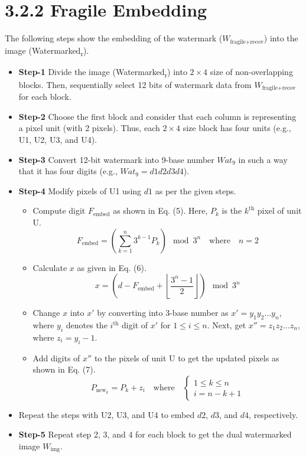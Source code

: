 \documentclass{article}
\begin{document}
\section*{3.2.2 Fragile Embedding}

The following steps show the embedding of the watermark ($W_{\text{fragile+recov}}$) into the image (Watermarked\textsubscript{r}).

\begin{itemize}
    \item \textbf{Step-1} Divide the image (Watermarked\textsubscript{r}) into $2 \times 4$ size of non-overlapping blocks. Then, sequentially select 12 bits of watermark data from $W_{\text{fragile+recov}}$ for each block.
    
    \item \textbf{Step-2} Choose the first block and consider that each column is representing a pixel unit (with 2 pixels). Thus, each $2 \times 4$ size block has four units (e.g., U1, U2, U3, and U4).
    
    \item \textbf{Step-3} Convert 12-bit watermark into 9-base number $Wat_9$ in such a way that it has four digits (e.g., $Wat_9 = d1d2d3d4$).
    
    \item \textbf{Step-4} Modify pixels of U1 using $d1$ as per the given steps.
    \begin{itemize}
        \item Compute digit $F_{\text{embed}}$ as shown in Eq. (5). Here, $P_k$ is the $k^{\text{th}}$ pixel of unit U.
        \[
        F_{\text{embed}} = \left( \sum_{k=1}^n 3^{k-1} P_k \right) \mod 3^n \quad \text{where} \quad n = 2
        \]
        
        \item Calculate $x$ as given in Eq. (6).
        \[
        x = \left( d - F_{\text{embed}} + \left\lfloor \frac{3^n - 1}{2} \right\rfloor \right) \mod 3^n
        \]
        
        \item Change $x$ into $x'$ by converting into 3-base number as $x' = y_1 y_2 \ldots y_n$, where $y_i$ denotes the $i^{\text{th}}$ digit of $x'$ for $1 \leq i \leq n$. Next, get $x'' = z_1 z_2 \ldots z_n$, where $z_i = y_i - 1$.
        
        \item Add digits of $x''$ to the pixels of unit U to get the updated pixels as shown in Eq. (7).
        \[
        P_{\text{new}_k} = P_k + z_i \quad \text{where} \quad
        \begin{cases}
            1 \leq k \leq n \\
            i = n - k + 1
        \end{cases}
        \]
    \end{itemize}
    
    \item Repeat the steps with U2, U3, and U4 to embed $d2$, $d3$, and $d4$, respectively.
    
    \item \textbf{Step-5} Repeat step 2, 3, and 4 for each block to get the dual watermarked image $W_{\text{img}}$.
\end{itemize}
\end{document}
